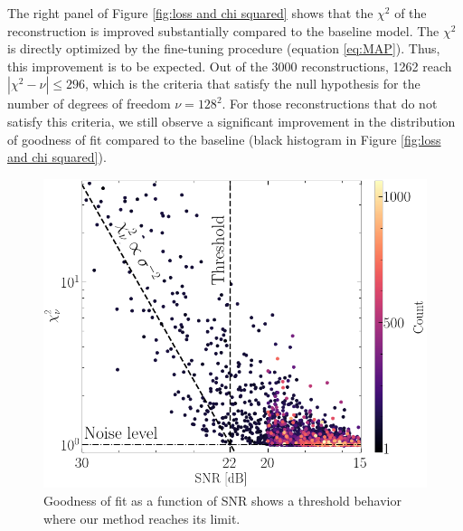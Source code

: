 The right panel of Figure \ref{fig:loss and chi squared} shows that 
the $\chi^2$ of the reconstruction is improved substantially compared to the 
baseline model. The $\chi^2$ is directly optimized by the fine-tuning procedure 
(equation \eqref{eq:MAP}). Thus, this improvement is to be expected. 
Out of the 
3000 reconstructions, 1262 reach $|\chi^2 - \nu| \leq 296$, which is the criteria 
that satisfy the null hypothesis for the number of degrees of freedom 
$\nu=128^{2}$. For those reconstructions that do not satisfy this criteria, 
we still observe a significant improvement in the distribution of goodness of fit 
compared to the baseline (black histogram in Figure \ref{fig:loss and chi squared}).

\begin{figure}[t!]
        \centering
        \includegraphics[width=\columnwidth]{figures/chisq_vs_noise_ewc}
        \caption{Goodness of fit as a function of SNR shows a threshold 
        behavior where our method reaches its limit.}
        \label{fig:chi squared vs noise}
\end{figure}

